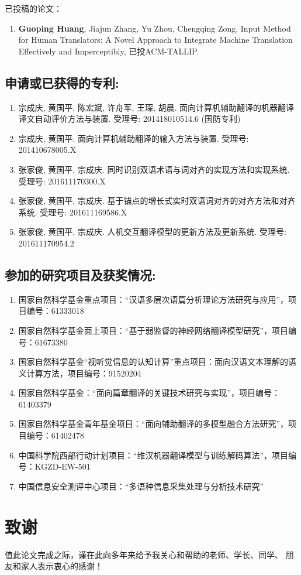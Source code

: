 \noindent 已投稿的论文：

\begin{enumerate}[(1)]
	\item \textbf{Guoping Huang}, Jiajun Zhang, Yu Zhou, Chengqing Zong. Input Method for Human Translators: A Novel Approach to Integrate Machine Translation Effectively and Imperceptibly, 已投ACM-TALLIP.
\end{enumerate}

\section*{申请或已获得的专利:}

\begin{enumerate}[(1)]
	\item 宗成庆, 黄国平, 陈宏斌, 许舟军, 王琛, 胡晨. 面向计算机辅助翻译的机器翻译译文自动评价方法与装置. 受理号: 201418010514.6 (国防专利)

	\item 宗成庆, 黄国平. 面向计算机辅助翻译的输入方法与装置. 受理号: 201410678005.X

	\item 张家俊, 黄国平, 宗成庆. 同时识别双语术语与词对齐的实现方法和实现系统. 受理号: 201611170300.X

	\item 张家俊, 黄国平, 宗成庆. 基于锚点的增长式实时双语词对齐的对齐方法和对齐系统. 受理号: 201611169586.X

	\item 张家俊, 黄国平, 宗成庆. 人机交互翻译模型的更新方法及更新系统. 受理号: 201611170954.2
\end{enumerate}

\section*{参加的研究项目及获奖情况:}

\begin{enumerate}[(1)]
	\item 国家自然科学基金重点项目：“汉语多层次语篇分析理论方法研究与应用”，项目编号：61333018

	\item 国家自然科学基金面上项目：“基于弱监督的神经网络翻译模型研究”，项目编号：61673380

	\item 国家自然科学基金“视听觉信息的认知计算”重点项目：面向汉语文本理解的语义计算方法，项目编号：91520204

	\item 国家自然科学基金：“面向篇章翻译的关键技术研究与实现”，项目编号：61403379

	\item 国家自然科学基金青年基金项目：“面向辅助翻译的多模型融合方法研究”，项目编号：61402478

	\item 中国科学院西部行动计划项目：“维汉机器翻译模型与训练解码算法”，项目编号：KGZD-EW-501

	\item 中国信息安全测评中心项目：“多语种信息采集处理与分析技术研究”
\end{enumerate}

\chapter{致\quad 谢}

值此论文完成之际，谨在此向多年来给予我关心和帮助的老师、学长、同学、
朋友和家人表示衷心的感谢！
